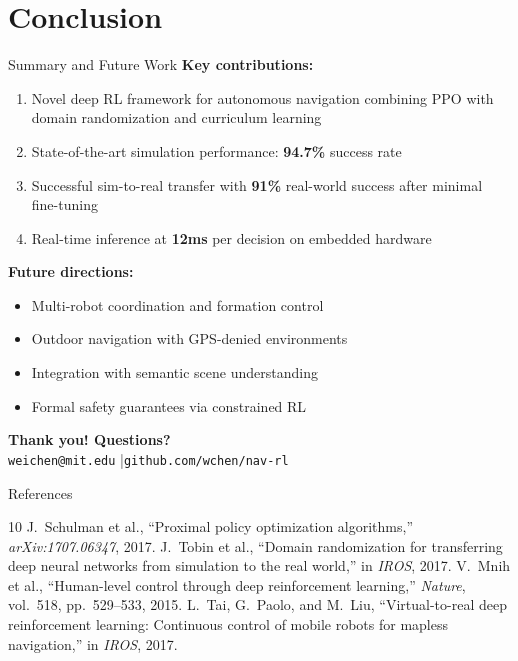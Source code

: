 \documentclass[aspectratio=169]{beamer}
\begin{document}
\section{Conclusion}

\begin{frame}{Summary and Future Work}
  \textbf{Key contributions:}
  \begin{enumerate}
    \item Novel deep RL framework for autonomous navigation combining PPO with domain randomization and curriculum learning
    \item State-of-the-art simulation performance: \textbf{94.7\%} success rate
    \item Successful sim-to-real transfer with \textbf{91\%} real-world success after minimal fine-tuning
    \item Real-time inference at \textbf{12ms} per decision on embedded hardware
  \end{enumerate}

  \vspace{0.5cm}
  \textbf{Future directions:}
  \begin{itemize}
    \item Multi-robot coordination and formation control
    \item Outdoor navigation with GPS-denied environments
    \item Integration with semantic scene understanding
    \item Formal safety guarantees via constrained RL
  \end{itemize}

  \vspace{0.5cm}
  \centering
  \textbf{\large Thank you! Questions?}\\[0.3cm]
  \small\texttt{weichen@mit.edu} \quad|\quad \texttt{github.com/wchen/nav-rl}
\end{frame}

\begin{frame}[allowframebreaks]{References}
  \tiny
  \begin{thebibliography}{10}
   J.~Schulman et al., ``Proximal policy optimization algorithms,'' \textit{arXiv:1707.06347}, 2017.
   J.~Tobin et al., ``Domain randomization for transferring deep neural networks from simulation to the real world,'' in \textit{IROS}, 2017.
   V.~Mnih et al., ``Human-level control through deep reinforcement learning,'' \textit{Nature}, vol.~518, pp.~529--533, 2015.
   L.~Tai, G.~Paolo, and M.~Liu, ``Virtual-to-real deep reinforcement learning: Continuous control of mobile robots for mapless navigation,'' in \textit{IROS}, 2017.
  \end{thebibliography}
\end{frame}
\end{document}
